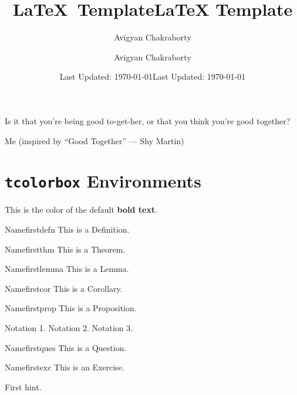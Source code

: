 \documentclass[12pt]{scrartcl}
\title{\textcolor{bubured}{\textrm{\LaTeX}\ Template}}
\author{\textcolor{bubured}{Avigyan Chakraborty}}
\date{\textcolor{bubured}{Last Updated: \today}}
\begin{document}
\maketitle

\title{LaTeX Template}
\author{Avigyan Chakraborty}
\date{Last Updated: \today}

\epigraph{Is it that you're being good to-get-her, or that you think
you're good together?}{Me (inspired by “Good Together” --- Shy Martin)}

\tableofcontents

\newpage

\section{\texttt{tcolorbox} Environments}

This is the color of the default \textbf{bold text}.

\begin{definition}{Name}{firstdefn}
  This is a Definition.
\end{definition}

\begin{theorem}{Name}{firstthm}
  This is a Theorem.
\end{theorem}

\begin{lemma}{Name}{firstlemma}
  This is a Lemma.
\end{lemma}

\begin{corollary}{Name}{firstcor}
  This is a Corollary.
\end{corollary}

\begin{proposition}{Name}{firstprop}
  This is a Proposition.
\end{proposition}

\begin{notation}{}{}
  \begin{itemize}
      \ii Notation 1.
      \ii Notation 2.
      \ii Notation 3.
  \end{itemize}
\end{notation}

\begin{question}{Name}{firstques}
  This is a Question.
\end{question}

\begin{exercise}{Name}{firstexc}
  This is an Exercise.
\end{exercise}
\begin{hints}{}{}
  \begin{hint}
    First hint.
  \end{hint}
\end{hints}
\end{document}

